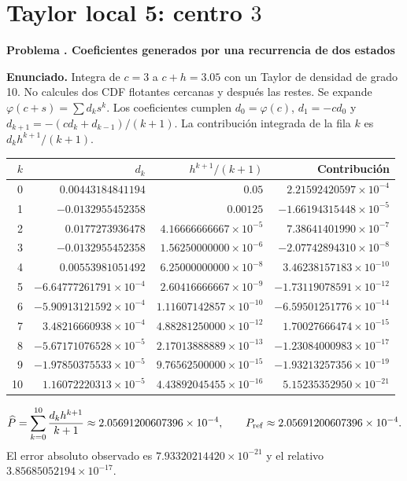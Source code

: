 \documentclass[11pt,a4paper]{article}
\theoremstyle{definition}
\newcounter{problema}
\newenvironment{resuelto}[1]{\refstepcounter{problema}\par\medskip\Needspace{6\baselineskip}\textbf{Problema \theproblema. #1}\par}{\par\medskip}
\begin{document}
\section{\texorpdfstring{Taylor local 5: centro $3$}{Taylor local 5: centro 3}}
\begin{resuelto}{Coeficientes generados por una recurrencia de dos estados}
\textbf{Enunciado.} Integra de $c=3$ a $c+h=3.05$ con un Taylor de densidad de grado 10. No calcules dos CDF flotantes cercanas y después las restes.
Se expande $\varphi(c+s)=\sum d_ks^k$. Los coeficientes cumplen $d_0=\varphi(c)$, $d_1=-cd_0$ y $d_{k+1}=-(cd_k+d_{k-1})/(k+1)$. La contribución integrada de la fila $k$ es $d_kh^{k+1}/(k+1)$.

\begin{center}\small\begin{tabular}{rrrr}
\toprule
$k$&$d_k$&$h^{k+1}/(k+1)$&Contribución\\
\midrule
0&$0.00443184841194$&$0.05$&$2.21592420597\times10^{-4}$\\
1&$-0.0132955452358$&$0.00125$&$-1.66194315448\times10^{-5}$\\
2&$0.0177273936478$&$4.16666666667\times10^{-5}$&$7.38641401990\times10^{-7}$\\
3&$-0.0132955452358$&$1.56250000000\times10^{-6}$&$-2.07742894310\times10^{-8}$\\
4&$0.00553981051492$&$6.25000000000\times10^{-8}$&$3.46238157183\times10^{-10}$\\
5&$-6.64777261791\times10^{-4}$&$2.60416666667\times10^{-9}$&$-1.73119078591\times10^{-12}$\\
6&$-5.90913121592\times10^{-4}$&$1.11607142857\times10^{-10}$&$-6.59501251776\times10^{-14}$\\
7&$3.48216660938\times10^{-4}$&$4.88281250000\times10^{-12}$&$1.70027666474\times10^{-15}$\\
8&$-5.67171076528\times10^{-5}$&$2.17013888889\times10^{-13}$&$-1.23084000983\times10^{-17}$\\
9&$-1.97850375533\times10^{-5}$&$9.76562500000\times10^{-15}$&$-1.93213257356\times10^{-19}$\\
10&$1.16072220313\times10^{-5}$&$4.43892045455\times10^{-16}$&$5.15235352950\times10^{-21}$\\
\bottomrule\end{tabular}\end{center}
\[
\widehat P=\sum_{k=0}^{10}\frac{d_kh^{k+1}}{k+1}\approx2.05691200607396\times10^{-4},\qquad P_{\rm ref}\approx2.05691200607396\times10^{-4}.
\]
El error absoluto observado es $7.93320214420\times10^{-21}$ y el relativo $3.85685052194\times10^{-17}$.

\end{resuelto}
\end{document}
